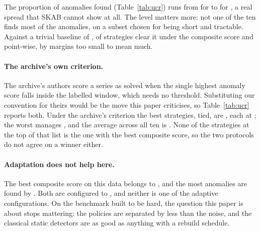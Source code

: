 \begin{table}[t]
\centering

\caption{The UCR subset, averaged over \NUcrSeries{} series and \NSeeds{} seeds.
``Anomalies found'' is the proportion of series whose single anomaly the
strategy flagged at all, which is event-level recall when every series has
exactly one event. The trivial baseline finds every anomaly by definition and
pays for it in precision.}
\label{tab:ucr}
\end{table}

The proportion of anomalies found (Table~\ref{tab:ucr}) runs from
\WorstUcrFound{} for \WorstUcrName{} to \BestUcrFound{} for \BestUcrName{}, a
real spread that SKAB cannot show at all. The level matters more: not one of the
ten finds most of the anomalies, on a subset chosen for being short and
tractable. Against a trivial baseline of \UcrFlagAll{},
\NUcrBeatComposite{} of \NStrategies{} strategies clear it under the composite
score and \NUcrBeatPoint{} point-wise, by margins too small to mean much.

\paragraph{The archive's own criterion.} The archive's authors score a series as solved
when the single highest anomaly score falls inside the labelled window, which
needs no threshold. Substituting our convention for theirs would be the move
this paper criticises, so Table~\ref{tab:ucr} reports both. Under the archive's
criterion the best strategies, tied, are \BestUcrTopOne{}, each at
\BestUcrTopOneVal{}; the worst manages \WorstUcrTopOneVal{}, and the average
across all ten is \MeanUcrTopOne{}. None of the strategies at the top of that
list is the one with the best composite score, so the two protocols do not
agree on a winner either.

\paragraph{Adaptation does not help here.} The best composite score on this data
belongs to \BestUcrComposite{}, and the most anomalies are found by
\BestUcrName{}. Both are configured to \emph{\BestUcrPolicy{}}, and neither is
one of the \NUcrAdaptive{} adaptive configurations. On the benchmark built to be hard,
the question this paper is about stops mattering: the policies are separated by
less than the noise, and the classical static detectors are as good as anything
with a rebuild schedule.

